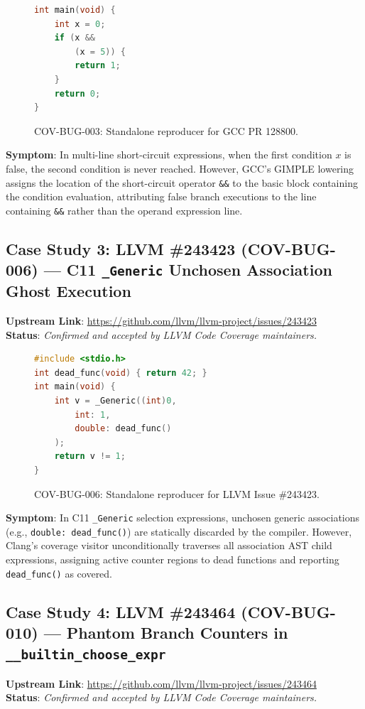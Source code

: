 \documentclass[sigconf,review,anonymous=false]{acmart}
\theoremstyle{definition}
\begin{document}
\begin{figure}[h]
\begin{lstlisting}[language=C]
int main(void) {
    int x = 0;
    if (x &&
        (x = 5)) {
        return 1;
    }
    return 0;
}
\end{lstlisting}
\caption{COV-BUG-003: Standalone reproducer for GCC PR 128800.}
\label{fig:repro_bug003}
\end{figure}

\textbf{Symptom}: In multi-line short-circuit expressions, when the first condition $x$ is false, the second condition is never reached. However, GCC's GIMPLE lowering assigns the location of the short-circuit operator \texttt{\&\&} to the basic block containing the condition evaluation, attributing false branch executions to the line containing \texttt{\&\&} rather than the operand expression line.

\subsection{Case Study 3: LLVM \#243423 (COV-BUG-006) — C11 \texttt{\_Generic} Unchosen Association Ghost Execution}
\textbf{Upstream Link}: \url{https://github.com/llvm/llvm-project/issues/243423} \\
\textbf{Status}: \textit{Confirmed and accepted by LLVM Code Coverage maintainers.}

\begin{figure}[h]
\begin{lstlisting}[language=C]
#include <stdio.h>
int dead_func(void) { return 42; }
int main(void) {
    int v = _Generic((int)0,
        int: 1,
        double: dead_func()
    );
    return v != 1;
}
\end{lstlisting}
\caption{COV-BUG-006: Standalone reproducer for LLVM Issue \#243423.}
\label{fig:repro_bug006}
\end{figure}

\textbf{Symptom}: In C11 \texttt{\_Generic} selection expressions, unchosen generic associations (e.g., \texttt{double: dead\_func()}) are statically discarded by the compiler. However, Clang's coverage visitor unconditionally traverses all association AST child expressions, assigning active counter regions to dead functions and reporting \texttt{dead\_func()} as covered.

\subsection{Case Study 4: LLVM \#243464 (COV-BUG-010) — Phantom Branch Counters in \texttt{\_\_builtin\_choose\_expr}}
\textbf{Upstream Link}: \url{https://github.com/llvm/llvm-project/issues/243464} \\
\textbf{Status}: \textit{Confirmed and accepted by LLVM Code Coverage maintainers.}
\end{document}
